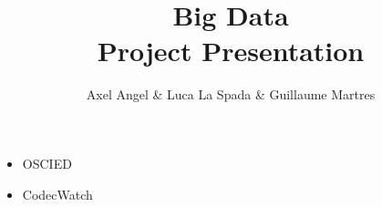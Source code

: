 \documentclass{beamer}
\title{Big Data\\Project Presentation}
\author{Axel Angel \& Luca La Spada \& Guillaume Martres}
\begin{document}
\begin{frame}
    \begin{itemize}
        \item OSCIED
        \item CodecWatch
    \end{itemize}
\end{frame}
\end{document}
